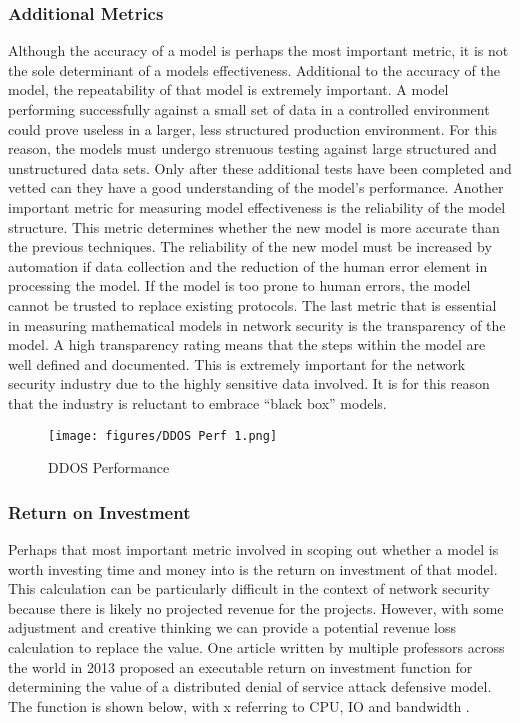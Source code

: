 \documentclass{article}
\begin{document}
\subsubsection{Additional Metrics}
Although the accuracy of a model is perhaps the most important metric, it is not the sole determinant of a models effectiveness. Additional to the accuracy of the model, the repeatability of that model is extremely important. A model performing successfully against a small set of data in a controlled environment could prove useless in a larger, less structured production environment. For this reason, the models must undergo strenuous testing against large structured and unstructured data sets. Only after these additional tests have been completed and vetted can they have a good understanding of the model’s performance. Another important metric for measuring model effectiveness is the reliability of the model structure. This metric determines whether the new model is more accurate than the previous techniques. The reliability of the new model must be increased by automation if data collection and the reduction of the human error element in processing the model. If the model is too prone to human errors, the model cannot be trusted to replace existing protocols. The last metric that is essential in measuring mathematical models in network security is the transparency of the model. A high transparency rating means that the steps within the model are well defined and documented. This is extremely important for the network security industry due to the highly sensitive data involved. It is for this reason that the industry is reluctant to embrace “black box” models. 
 
\begin{figure}
    \centering
    \texttt{[image: figures/DDOS Perf 1.png]}
    \caption{DDOS Performance}
\end{figure}

\subsubsection{Return on Investment}
Perhaps that most important metric involved in scoping out whether a model is worth investing time and money into is the return on investment of that model. This calculation can be particularly difficult in the context of network security because there is likely no projected revenue for the projects. However, with some adjustment and creative thinking we can provide a potential revenue loss calculation to replace the value. One article written by multiple professors across the world in 2013 proposed an executable return on investment function for determining the value of a distributed denial of service attack defensive model. The function is shown below, with x referring to CPU, IO and bandwidth \cite{yu2013can}. 
\end{document}
